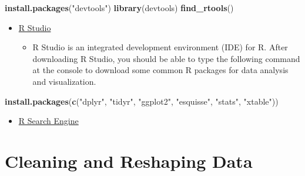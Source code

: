 \documentclass[]{book}
\newenvironment{Shaded}{\begin{snugshade}}{\end{snugshade}}
\newcommand{\KeywordTok}[1]{\textcolor[rgb]{0.13,0.29,0.53}{\textbf{#1}}}
\newcommand{\NormalTok}[1]{#1}
\newcommand{\StringTok}[1]{\textcolor[rgb]{0.31,0.60,0.02}{#1}}
\providecommand{\tightlist}{%
  \setlength{\itemsep}{0pt}\setlength{\parskip}{0pt}}
\begin{document}
\begin{Shaded}
\begin{Highlighting}[]
\KeywordTok{install.packages}\NormalTok{(}\StringTok{"devtools"}\NormalTok{)}
\KeywordTok{library}\NormalTok{(devtools)}
\KeywordTok{find_rtools}\NormalTok{()}
\end{Highlighting}
\end{Shaded}

\begin{itemize}
\item
  \href{https://www.rstudio.com/products/rstudio/download/\#download}{R Studio}

  \begin{itemize}
  \tightlist
  \item
    R Studio is an integrated development environment (IDE) for R. After downloading R Studio, you should be able to type the following command at the console to download some common R packages for data analysis and visualization.
  \end{itemize}
\end{itemize}

\begin{Shaded}
\begin{Highlighting}[]
\KeywordTok{install.packages}\NormalTok{(}\KeywordTok{c}\NormalTok{(}\StringTok{"dplyr"}\NormalTok{, }\StringTok{"tidyr"}\NormalTok{, }\StringTok{"ggplot2"}\NormalTok{, }\StringTok{"esquisse"}\NormalTok{, }\StringTok{"stats"}\NormalTok{, }\StringTok{"xtable"}\NormalTok{))}
\end{Highlighting}
\end{Shaded}

\begin{itemize}
\tightlist
\item
  \href{https://rseek.org/}{R Search Engine}
\end{itemize}

\hypertarget{cleaning-and-reshaping-data}{%
\section{Cleaning and Reshaping Data}\label{cleaning-and-reshaping-data}}
\end{document}
